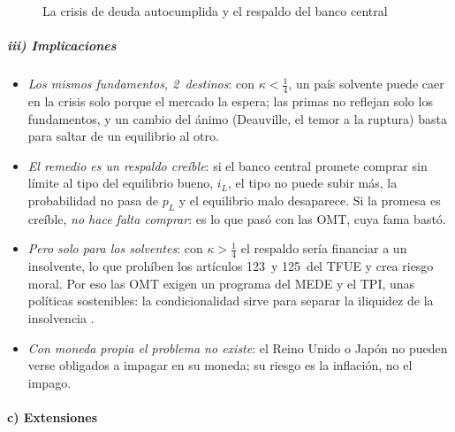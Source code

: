 \documentclass[11pt]{article}
\begin{document}
\begin{figure}[H]
\centering
\caption{La crisis de deuda autocumplida y el respaldo del banco central}\label{fig:crisis-autocumplida}
\end{figure}

\subparagraph{iii) Implicaciones}

\begin{itemize}
\item \emph{Los mismos fundamentos, 2~destinos}: con $\kappa<\tfrac14$, un país solvente puede caer en la crisis solo porque el mercado la espera; las primas no reflejan solo los fundamentos, y un cambio del ánimo (Deauville, el temor a la ruptura) basta para saltar de un equilibrio al otro.
\item \emph{El remedio es un respaldo creíble}: si el banco central promete comprar sin límite al tipo del equilibrio bueno, $i_L$, el tipo no puede subir más, la probabilidad no pasa de $p_L$ y el equilibrio malo desaparece. Si la promesa es creíble, \emph{no hace falta comprar}: es lo que pasó con las OMT, cuya fama bastó.
\item \emph{Pero solo para los solventes}: con $\kappa>\tfrac14$ el respaldo sería financiar a un insolvente, lo que prohíben los artículos 123~y 125~del TFUE y crea riesgo moral. Por eso las OMT exigen un programa del MEDE y el TPI, unas políticas sostenibles: la condicionalidad sirve para separar la iliquidez de la insolvencia .
\item \emph{Con moneda propia el problema no existe}: el Reino Unido o Japón no pueden verse obligados a impagar en su moneda; su riesgo es la inflación, no el impago.
\end{itemize}

\paragraph{c) Extensiones}
\end{document}
